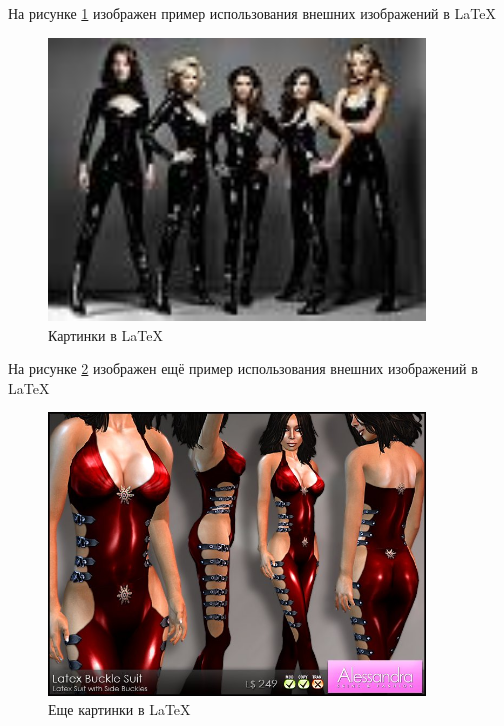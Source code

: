 

\maketitle
На рисунке \ref{f:1} изображен пример использования внешних изображений в LaTeX

\begin{figure}[h]
\begin{center}
\includegraphics[width=100mm]{testimage.jpg}
\end{center}
\caption{Картинки в LaTeX}
\label{f:1}
\end{figure}
На рисунке \ref{f:2} изображен ещё пример использования внешних изображений в LaTeX
\begin{figure}[h!]
\begin{center}
\includegraphics[width=100mm]{testimage2.png}
\end{center} 
\caption{Еще картинки в LaTeX}
\label{f:2}
\end{figure}

